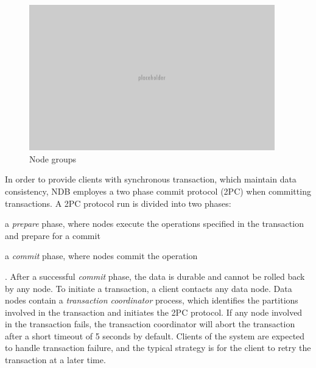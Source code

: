 \begin{figure}[h]
\caption{Node groups}
\label{fig:ndb-node-groups}
\centering
\includegraphics[width=0.95\textwidth]{images/placeholder.png}
\end{figure}

In order to provide clients with synchronous transaction, which maintain data consistency, NDB employes a two phase commit protocol (2PC) when committing transactions.
A 2PC protocol run is divided into two phases: \begin{inparaenum}
    \item a \emph{prepare} phase, where nodes execute the operations specified in the transaction and prepare for a commit
    \item a \emph{commit} phase, where nodes commit the operation
\end{inparaenum}.
After a successful \emph{commit} phase, the data is durable and cannot be rolled back by any node.
To initiate a transaction, a client contacts any data node.
Data nodes contain a \emph{transaction coordinator} process, which identifies the partitions involved in the transaction and initiates the 2PC protocol.
If any node involved in the transaction fails, the transaction coordinator will abort the transaction after a short timeout of 5 seconds by default.
Clients of the system are expected to handle transaction failure, and the typical strategy is for the client to retry the transaction at a later time.

